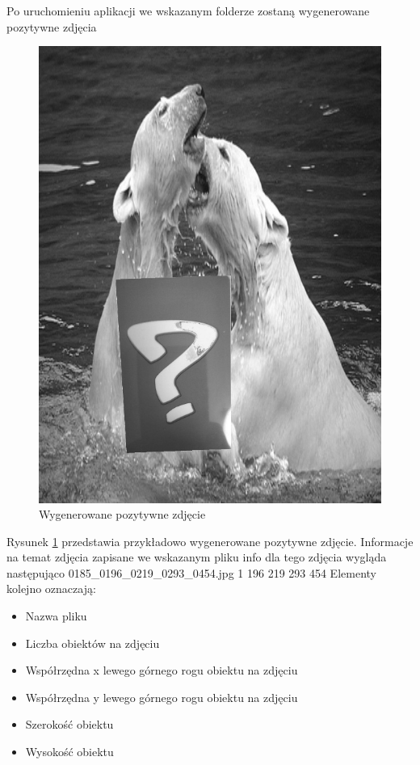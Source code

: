 \documentclass{article}
\numberwithin{equation}{section}
\begin{document}
Po uruchomieniu aplikacji we wskazanym folderze zostaną wygenerowane pozytywne zdjęcia 

\begin{figure}[H]
\centering
\includegraphics[scale=0.2]{0448_0134_0398_0203_0316.jpg}
\caption{Wygenerowane pozytywne zdjęcie}
\label{fig:misie}
\end{figure}

Rysunek \ref{fig:misie} przedstawia przykładowo wygenerowane pozytywne zdjęcie. Informacje na temat zdjęcia zapisane we wskazanym pliku info dla tego zdjęcia wygląda następująco
0185\_0196\_0219\_0293\_0454.jpg 1 196 219 293 454
Elementy kolejno oznaczają:

\begin{itemize}
    \item Nazwa pliku
    \item Liczba obiektów na zdjęciu
    \item Współrzędna x lewego górnego rogu obiektu na zdjęciu
    \item Współrzędna y lewego górnego rogu obiektu na zdjęciu
    \item Szerokość obiektu
    \item Wysokość obiektu

\end{itemize}
\end{document}
